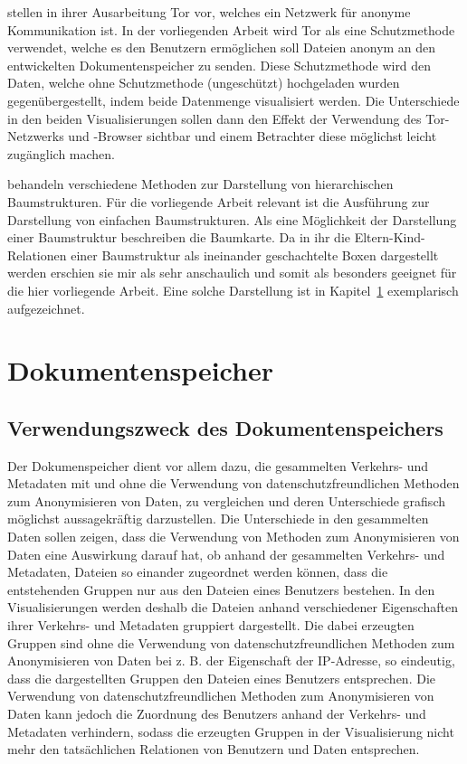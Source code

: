 \documentclass[
    fontsize=12pt,
    headings=small,
    parskip=half,           %
    bibliography=totoc,
    numbers=noenddot,       %
    open=any,               %
    ]{scrreprt}
\begin{document}
\textcite{Tor} stellen in ihrer Ausarbeitung Tor vor, welches ein Netzwerk für anonyme Kommunikation ist.
In der vorliegenden Arbeit wird Tor als eine Schutzmethode verwendet, welche es den Benutzern ermöglichen soll Dateien anonym an den entwickelten Dokumentenspeicher zu senden.
Diese Schutzmethode wird den Daten, welche ohne Schutzmethode (ungeschützt) hochgeladen wurden gegenübergestellt, indem beide Datenmenge visualisiert werden.
Die Unterschiede in den beiden Visualisierungen sollen dann den Effekt der Verwendung des Tor-Netzwerks und -Browser sichtbar und einem Betrachter diese möglichst leicht zugänglich machen.

\textcite{Grah10} behandeln verschiedene Methoden zur Darstellung von hierarchischen Baumstrukturen.
Für die vorliegende Arbeit relevant ist die Ausführung zur Darstellung von einfachen Baumstrukturen.
Als eine Möglichkeit der Darstellung einer Baumstruktur beschreiben \textcite{Grah10} die Baumkarte.
Da in ihr die Eltern-Kind-Relationen einer Baumstruktur als ineinander geschachtelte Boxen dargestellt werden \cite[p. 4-5]{Grah10} erschien sie mir als sehr anschaulich und somit als besonders geeignet für die hier vorliegende Arbeit.
Eine solche Darstellung ist in Kapitel~\ref{Kap:Dokumentenspeicher} exemplarisch aufgezeichnet.

\chapter{Dokumentenspeicher} \label{Kap:Dokumentenspeicher}

    \section{Verwendungszweck des Dokumentenspeichers} 

Der Dokumenspeicher dient vor allem dazu, die gesammelten Verkehrs- und Metadaten mit und ohne die Verwendung von datenschutzfreundlichen Methoden zum Anonymisieren von Daten, zu vergleichen und deren Unterschiede grafisch möglichst aussagekräftig darzustellen.
Die Unterschiede in den gesammelten Daten sollen zeigen, dass die Verwendung von Methoden zum Anonymisieren von Daten eine Auswirkung darauf hat, ob anhand der gesammelten Verkehrs- und Metadaten, Dateien so einander zugeordnet werden können, dass die entstehenden Gruppen nur aus den Dateien eines Benutzers bestehen.
In den Visualisierungen werden deshalb die Dateien anhand verschiedener Eigenschaften ihrer Verkehrs- und Metadaten gruppiert dargestellt.
Die dabei erzeugten Gruppen sind ohne die Verwendung von datenschutzfreundlichen Methoden zum Anonymisieren von Daten bei z. B. der Eigenschaft der IP-Adresse, so eindeutig, dass die dargestellten Gruppen den Dateien eines Benutzers entsprechen.
Die Verwendung von datenschutzfreundlichen Methoden zum Anonymisieren von Daten kann jedoch die Zuordnung des Benutzers anhand der Verkehrs- und Metadaten verhindern, sodass die erzeugten Gruppen in der Visualisierung nicht mehr den tatsächlichen Relationen von Benutzern und Daten entsprechen.
\end{document}
